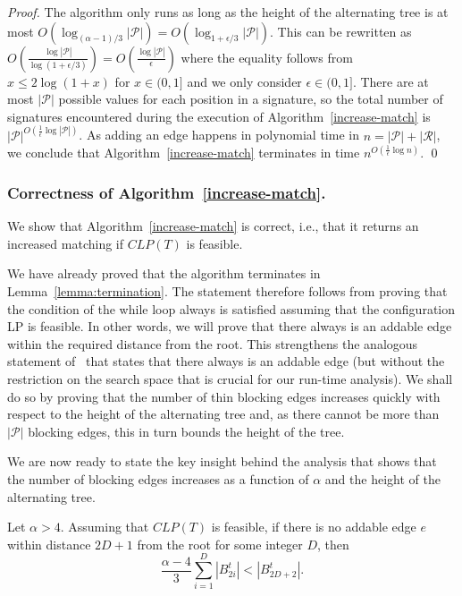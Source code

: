 \documentclass{llncs}
\newcommand{\res}{\ensuremath{\mathcal{R}}\xspace}
\newcommand{\players}{\ensuremath{\mathcal{P}}\xspace}
\begin{document}
\begin{proof}
The algorithm only runs as long as the height of the alternating tree is at most
$O(\log_{(\alpha-1)/3}|\players|)=O(\log_{1+\epsilon/3} |\players|)$. This can
be rewritten as
$
  O\left(\frac{\log |\players|}{\log (1+\epsilon/3)}\right)=
  O\left(\frac{\log |\players|}{\epsilon}\right)
$
where the equality follows from $x\leq 2\log(1+x)$ for $x\in(0,1]$ and we only
consider $\epsilon\in(0, 1]$. There are at most
$|\players|$ possible values for each position in a signature, so the total
number of signatures encountered during the execution of
Algorithm~\ref{increase-match} is $|\players|^{O\left(\frac{1}{\epsilon} \log
|\players|\right)}$. As adding an edge happens in polynomial time in $n =
|\players| + |\res|$, we conclude that Algorithm~\ref{increase-match} terminates
in time $n^{O\left(\frac{1}{\epsilon}\log n\right)}$. \qed
\end{proof}


\subsubsection{Correctness of Algorithm~\ref{increase-match}.}
\label{sec:correctness}
We show that Algorithm~\ref{increase-match} is correct, i.e., that it
returns an increased matching if $CLP(T)$ is feasible.

We have already proved that the algorithm terminates in
Lemma~\ref{lemma:termination}. The statement therefore follows from
proving that the condition of the while loop always is satisfied
assuming that the configuration LP is feasible. In other words, we
will prove that there always is an addable edge within the required
distance from the root. This strengthens the analogous statement
of~\cite{AFS08} that states that there always is an addable edge (but
without the restriction on the search space that is crucial for our run-time analysis).  We shall do so by proving
that the number of thin blocking edges increases quickly with respect
to the height of the alternating tree and, as there cannot be more
than $|\players|$ blocking edges, this in turn bounds the height of
the tree.

We are now ready to state the key insight behind the analysis that shows that
the number of blocking edges increases as a function of $\alpha$ and the height
of the alternating tree.
\begin{lemma}
Let $\alpha >4$. Assuming that $CLP(T)$ is feasible, if there is no
addable edge $e$ within distance $2D+1$ from the root for some integer $D$, then
\begin{equation*}
\frac{\alpha-4}{3} \sum_{i=1}^D |B^t_{2i}| < |B^t_{2D+2}|.
\end{equation*}
\label{lem:combinatorial}
\end{lemma}
\end{document}
